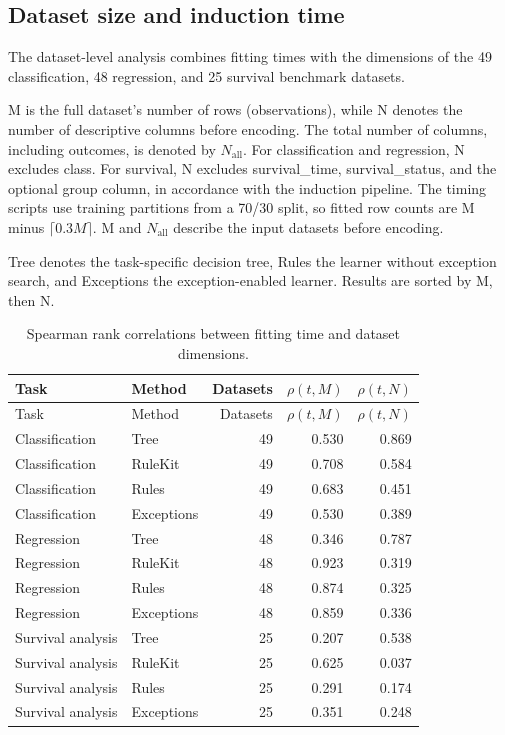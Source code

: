 
\subsection{Dataset size and induction time}
\label{runtime-by-size}

The dataset-level analysis combines fitting times with the dimensions of the
49 classification, 48 regression, and 25 survival benchmark datasets.

M is the full dataset's number of rows (observations), while N denotes the
number of descriptive columns before encoding.
The total number of columns, including outcomes, is denoted by
$N_{\mathrm{all}}$.
For classification and regression, N excludes class. For survival, N excludes
survival\_time, survival\_status, and the optional group column, in accordance
with the induction pipeline. The timing scripts use training partitions from
a 70/30 split, so fitted row counts are M minus $\lceil 0.3M \rceil$.
M and $N_{\mathrm{all}}$ describe the input datasets before encoding.

Tree denotes
the task-specific decision tree, Rules the learner without exception search,
and Exceptions the exception-enabled learner. Results are sorted by M, then N.
\begingroup
\footnotesize
\setlength{\tabcolsep}{3pt}
\begin{longtable}{@{}llrrr@{}}
\caption{Spearman rank correlations between fitting time and dataset dimensions.}\\
\toprule
Task & Method & Datasets & $\rho(t,M)$ & $\rho(t,N)$ \\
\midrule
\endfirsthead
\toprule
Task & Method & Datasets & $\rho(t,M)$ & $\rho(t,N)$ \\
\midrule
\endhead
Classification & Tree & 49 & 0.530 & 0.869 \\
Classification & RuleKit & 49 & 0.708 & 0.584 \\
Classification & Rules & 49 & 0.683 & 0.451 \\
Classification & Exceptions & 49 & 0.530 & 0.389 \\
Regression & Tree & 48 & 0.346 & 0.787 \\
Regression & RuleKit & 48 & 0.923 & 0.319 \\
Regression & Rules & 48 & 0.874 & 0.325 \\
Regression & Exceptions & 48 & 0.859 & 0.336 \\
Survival analysis & Tree & 25 & 0.207 & 0.538 \\
Survival analysis & RuleKit & 25 & 0.625 & 0.037 \\
Survival analysis & Rules & 25 & 0.291 & 0.174 \\
Survival analysis & Exceptions & 25 & 0.351 & 0.248 \\
\bottomrule
\end{longtable}
\endgroup

